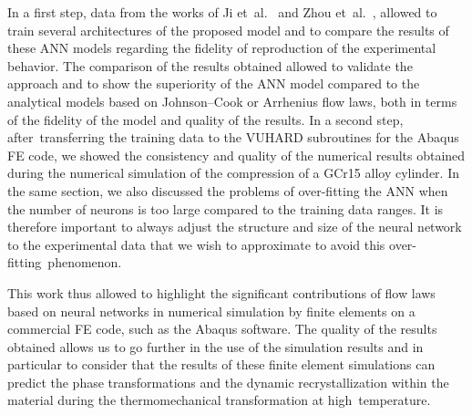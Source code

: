 \documentclass[algorithms,article,accept,pdftex,moreauthors]{Definitions/mdpi}
\begin{document}
In a first step, data from the works of Ji et~al.~\cite{Ji-2018} and Zhou et~al.~\cite{Zhou-2020}, allowed to train several architectures of the proposed model and to compare the results of these ANN models regarding the fidelity of reproduction of the experimental behavior.
The comparison of the results obtained allowed to validate the approach and to show the superiority of the ANN model compared to the analytical models based on Johnson--Cook or Arrhenius flow laws, both in terms of the fidelity of the model and quality of the results.
In a second step, after~transferring the training data to the VUHARD subroutines for the Abaqus FE code, we showed the consistency and quality of the numerical results obtained during the numerical simulation of the compression of a GCr15 alloy cylinder.
In the same section, we also discussed the problems of over-fitting the ANN when the number of neurons is too large compared to the training data ranges.
It is therefore important to always adjust the structure and size of the neural network to the experimental data that we wish to approximate to avoid this over-fitting~phenomenon.

This work thus allowed to highlight the significant contributions of flow laws based on neural networks in numerical simulation by finite elements on a commercial FE code, such as the Abaqus software.
The quality of the results obtained allows us to go further in the use of the simulation results and in particular to consider that the results of these finite element simulations can predict the phase transformations and the dynamic recrystallization within the material during the thermomechanical transformation at high~temperature.

\vspace{6pt}

\end{document}

